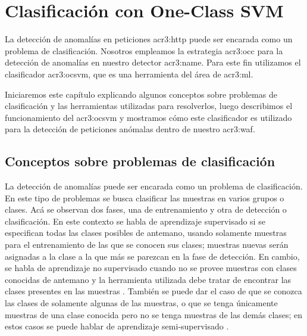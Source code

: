 \renewcommand{\newCommandChapterTitle}{Clasificación con One-Class SVM}
\chapter{\newCommandChapterTitle}
\markright{\hfill \thechapter. \newCommandChapterTitle}
\label{chap:p3_concepts_ocsvm}


La detección de anomalías en peticiones \gls{acr3:http} puede ser encarada
como un problema de clasificación. Nosotros empleamos la estrategia
\gls{acr3:occ} \citep{khan2009survey} %
para la detección de anomalías en nuestro detector \gls{acr3:name}.
Para este fin utilizamos el clasificador \gls{acr3:ocsvm}, que es una
herramienta del área de \gls{acr3:ml}.

Iniciaremos este capítulo explicando algunos conceptos sobre problemas
de clasificación y las herramientas utilizadas para resolverlos, luego
describimos el funcionamiento del \gls{acr3:ocsvm} y mostramos cómo este
clasificador es utilizado para la detección de peticiones anómalas
dentro de nuestro \gls{acr3:waf}.


\section{Conceptos sobre problemas de clasificación}

La detección de anomalías puede ser encarada como un problema de
clasificación. En este tipo de problemas se busca clasificar las muestras
en varios grupos o clases. Acá se observan dos fases, una de entrenamiento
y otra de detección o clasificación.
En este contexto se habla de aprendizaje supervisado si se especifican
todas las clases posibles de antemano, usando solamente muestras para el
entrenamiento de las que se conocen sus clases; muestras nuevas serán
asignadas a la clase a la que más se parezcan en la fase de detección.
En cambio, se habla de aprendizaje no supervisado cuando no se provee
muestras con clases conocidas de antemano y la herramienta utilizada
debe tratar de encontrar las clases presentes en las muestras
\citep{torranoGimenez2015study}. %
También se puede dar el caso de que se conozca las clases de solamente
algunas de las muestras, o que se tenga únicamente muestras de una clase
conocida pero no se tenga muestras de las demás clases; en estos casos
se puede hablar de aprendizaje semi-supervisado
\citep{aggarwal2013outlier}. %

